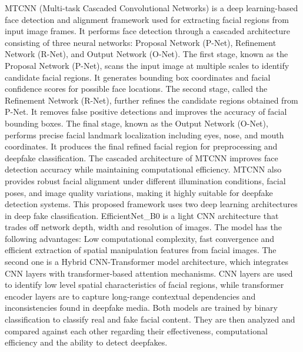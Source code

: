 \documentclass[12pt,a4paper]{report}
\begin{document}
MTCNN (Multi-task Cascaded Convolutional Networks) is a deep learning-based face detection and alignment framework used for extracting facial regions from input image frames. It performs face detection through a cascaded architecture consisting of three neural networks: Proposal Network (P-Net), Refinement Network (R-Net), and Output Network (O-Net). The first stage, known as the Proposal Network (P-Net), scans the input image at multiple scales to identify candidate facial regions. It generates bounding box coordinates and facial confidence scores for possible face locations. The second stage, called the Refinement Network (R-Net), further refines the candidate regions obtained from P-Net. It removes false positive detections and improves the accuracy of facial bounding boxes. The final stage, known as the Output Network (O-Net), performs precise facial landmark localization including eyes, nose, and mouth coordinates. It produces the final refined facial region for preprocessing and deepfake classification. The cascaded architecture of MTCNN improves face detection accuracy while maintaining computational efficiency. MTCNN also provides robust facial alignment under different illumination conditions, facial poses, and image quality variations, making it highly suitable for deepfake detection systems. This proposed framework uses two deep learning architectures in deep fake classification. EfficientNet\_B0 is a light CNN architecture that trades off network depth, width and resolution of images. The model has the following advantages: Low computational complexity, fast convergence and efficient extraction of spatial manipulation features from facial images. The second one is a Hybrid CNN-Transformer model architecture, which integrates CNN layers with transformer-based attention mechanisms. CNN layers are used to identify low level spatial characteristics of facial regions, while transformer encoder layers are to capture long-range contextual dependencies and inconsistencies found in deepfake media. Both models are trained by binary classification to classify real and fake facial content. They are then analyzed and compared against each other regarding their effectiveness, computational efficiency and the ability to detect deepfakes.
\end{document}
